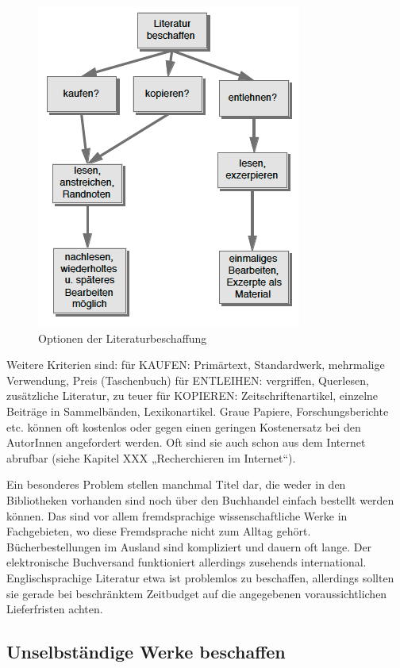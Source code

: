\documentclass[]{book}
\theoremstyle{definition}
\theoremstyle{definition}
\theoremstyle{definition}
\theoremstyle{remark}
\begin{document}
\begin{figure}

{\centering \includegraphics{images/recherchieren-literatur-beschaffen-min} 

}

\caption{Optionen der Literaturbeschaffung}\label{fig:unnamed-chunk-9}
\end{figure}

Weitere Kriterien sind: für KAUFEN: Primärtext, Standardwerk, mehrmalige
Verwendung, Preis (Taschenbuch) für ENTLEIHEN: vergriffen, Querlesen,
zusätzliche Literatur, zu teuer für KOPIEREN: Zeitschriftenartikel,
einzelne Beiträge in Sammelbänden, Lexikonartikel. Graue Papiere,
Forschungsberichte etc. können oft kostenlos oder gegen einen geringen
Kostenersatz bei den AutorInnen angefordert werden. Oft sind sie auch
schon aus dem Internet abrufbar (siehe Kapitel XXX „Recherchieren im
Internet``).

Ein besonderes Problem stellen manchmal Titel dar, die weder in den
Bibliotheken vorhanden sind noch über den Buchhandel einfach bestellt
werden können. Das sind vor allem fremdsprachige wissenschaftliche Werke
in Fachgebieten, wo diese Fremdsprache nicht zum Alltag gehört.
Bücherbestellungen im Ausland sind kompliziert und dauern oft lange. Der
elektronische Buchversand funktioniert allerdings zusehends
international. Englischsprachige Literatur etwa ist problemlos zu
beschaffen, allerdings sollten sie gerade bei beschränktem Zeitbudget
auf die angegebenen voraussichtlichen Lieferfristen achten.

\subsection{Unselbständige Werke
beschaffen}\label{unselbstandige-werke-beschaffen}
\end{document}
